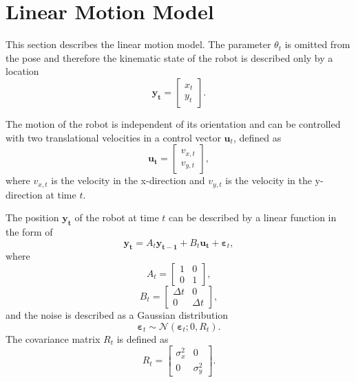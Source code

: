 \documentclass[12pt,oneside,openany,a4paper, %
afrikaans,english,
]{memoir}
\numberwithin{equation}{chapter}
\begin{document}
\section{Linear Motion Model}\label{sec:linearMotionModel}
This section describes the linear motion model. The parameter $\theta_t$ is omitted from the pose  and therefore the kinematic state of the robot is described only by a location
\begin{equation}
\bm{y_t} =
\begin{bmatrix}
x_t\\
y_t
\end{bmatrix}.
\end{equation}

The motion of the robot is independent of its orientation and can be controlled with two translational velocities in a control vector  $\bm{u}_t$, defined as
\begin{equation}
\bm{u_t} = 
\begin{bmatrix}
v_{x,t}\\
v_{y,t}
\end{bmatrix},
\end{equation}
where $v_{x,t}$ is the velocity in the x-direction and $v_{y,t}$ is the velocity in the y-direction at time $t$.

The position $\bm{y_t}$ of the robot at time $t$ can be described by a linear function in the form of
\begin{equation}\label{eq:lineartrans}
\bm{y_t} = A_t \bm{y_{t - 1}} + B_t \bm{u_t} + \bm{\varepsilon}_t,
\end{equation}
where
\begin{equation}
A_t =
\begin{bmatrix}
1 & 0\\
0 & 1
\end{bmatrix},
\end{equation}
\begin{equation}
B_t = \begin{bmatrix}
\Delta t & 0\\
0 & \Delta t
\end{bmatrix},
\end{equation}
and the noise is described as a Gaussian distribution
\begin{equation}
\bm{\varepsilon}_t \sim \mathcal{N}(\bm{\varepsilon}_t; 0, R_t).
\end{equation}
The covariance matrix $R_t$ is defined as
\begin{equation}
R_t = 
\begin{bmatrix}
\sigma_x^2 & 0\\
0 & \sigma_y^2
\end{bmatrix}.
\end{equation}
\end{document}
